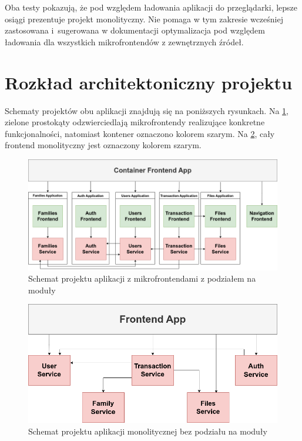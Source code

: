 \documentclass{SGGW-thesis}
\begin{document}
    Oba testy pokazują, że pod względem ładowania aplikacji do przeglądarki, lepsze osiągi prezentuje projekt monolityczny. Nie pomaga w tym zakresie wcześniej zastosowana i~sugerowana w dokumentacji \cite{singlespa} optymalizacja pod względem ładowania dla wszystkich mikrofrontendów z zewnętrznych źródeł.

  \section{Rozkład architektoniczny projektu}
  Schematy projektów obu aplikacji znajdują się na poniższych rysunkach. Na \cref{fig:monolith_fe_diagram}, zielone prostokąty odzwierciedlają mikrofrontendy realizujące konkretne funkcjonalności, natomiast kontener oznaczono kolorem szarym. Na \cref{fig:microservices_fe_diagram}, cały frontend monolityczny jest oznaczony kolorem szarym.

  \begin{figure}[h!]
    \centering
    \captionsetup{justification=centering}
    \includegraphics[width=\textwidth]{microfrontend-app-architecture.png}
    \caption{Schemat projektu aplikacji z mikrofrontendami z podziałem na moduły}
    \label{fig:monolith_fe_diagram}
  \end{figure}

  \pagebreak

  \begin{figure}[h]
    \centering
    \captionsetup{justification=centering}
    \includegraphics[width=\textwidth]{microservices-app-diagram.png}
    \caption{Schemat projektu aplikacji monolitycznej bez podziału na moduły}
    \label{fig:microservices_fe_diagram}
  \end{figure}
\end{document}
